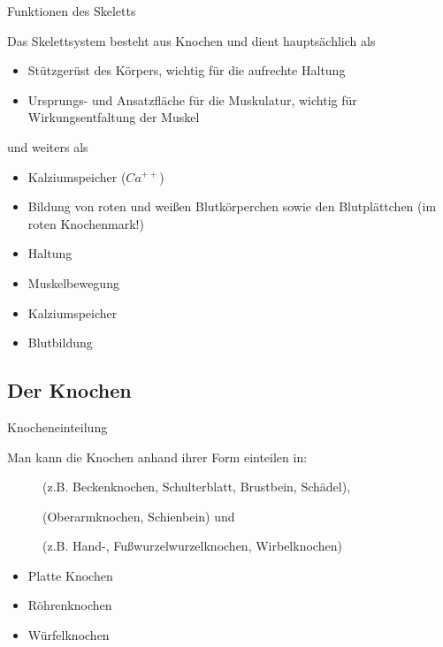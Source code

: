 {Funktionen des Skeletts}
{
Das Skelettsystem besteht aus Knochen und dient 
hauptsächlich als

\begin{itemize}
    \item Stützgerüst  des Körpers, wichtig für die aufrechte Haltung
    \item Ursprungs-  und Ansatzfläche für die Muskulatur, wichtig für
    Wirkungsentfaltung der Muskel
\end{itemize}

und weiters als

\begin{itemize}
    \item Kalziumspeicher ($Ca^{++}$)
    \item Bildung von roten und weißen Blutkörperchen sowie den Blutplättchen
    (im roten Knochenmark!) 
\end{itemize}
}
{
\begin{itemize}
  \item Haltung
  \item Muskelbewegung
  \item Kalziumspeicher
  \item Blutbildung
\end{itemize}
}
{}{}{}

\subsection{Der Knochen}

{Knocheneinteilung}
{
Man kann die Knochen anhand ihrer Form einteilen in: 
\begin{description}
    \item[] (z.B. Beckenknochen,
    Schulterblatt, Brustbein, Schädel),
    \item[] (Oberarmknochen, Schienbein)
    und
    \item[] (z.B. Hand-, Fußwurzelwurzelknochen,
    Wirbelknochen)
\end{description}
}
{
\begin{itemize}
  \item Platte Knochen
  \item Röhrenknochen
  \item Würfelknochen
\end{itemize}
}
{}{}{}


